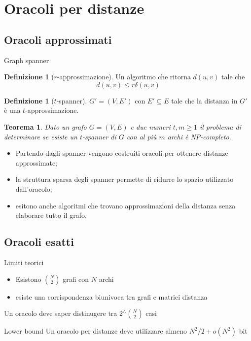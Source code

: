 \documentclass{beamer}
\newcounter{counter1}
\theoremstyle{plain}
\newtheorem{myteo}[counter1]{Teorema}
\theoremstyle{definition}
\newtheorem{mydef}[counter1]{Definizione}
\theoremstyle{remark}
\newcommand{\pa}[1]{\left(#1\right)}
\begin{document}
\section{Oracoli per distanze}

\subsection{Oracoli approssimati}

\begin{frame}{Graph spanner}
  \begin{mydef}[$r$-approssimazione]
    Un algoritmo che ritorna $d(u,v)$ tale che
    \[ d\pa{u,v} \le r \delta\pa{u,v} \]
  \end{mydef}

  \begin{mydef}[$t$-spanner]
    $G' = (V,E')$ con $E' \subseteq E$ tale che la distanza in $G'$
    \`e una $t$-approssimazione.
  \end{mydef}

  \begin{myteo}
    Dato un grafo $G = (V,E)$ e due numeri $t,m\ge 1$ il problema di
    determinare se esiste un $t$-spanner di $G$ con al pi\`u $m$ archi
    \`e NP-completo.
  \end{myteo}
\end{frame}

\begin{frame}{}
  \begin{itemize}
  \item Partendo dagli spanner vengono costruiti oracoli per ottenere
    distanze approssimate;
  \item la struttura sparsa degli spanner permette di ridurre lo
    spazio utilizzato dall'oracolo;
  \item esitono anche algoritmi che trovano approssimazioni della
    distanza senza elaborare tutto il grafo.
  \end{itemize}
\end{frame}

\subsection{Oracoli esatti}

\begin{frame}{Limiti teorici}
  \begin{itemize}
  \item Esistono $\binom{ N}{2}$ grafi con $N$ archi
  \item esiste una corrispondenza biunivoca tra grafi e matrici
    distanza
  \end{itemize}
  \pause \vfill

  Un oracolo deve saper distinugere tra $2 ^\wedge {\binom{ N}{2}}$
  casi \pause
  \begin{block}{Lower bound}
    Un oracolo per distanze deve utilizzare almeno $N^2 / 2 + o(N^2)$
    bit
  \end{block}
\end{frame}
\end{document}
